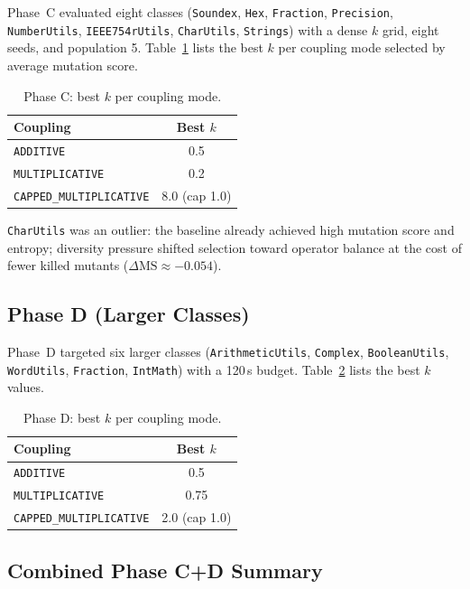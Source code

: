 \documentclass{IEEEtran}
\begin{document}
Phase~C evaluated eight classes (\texttt{Soundex}, \texttt{Hex}, \texttt{Fraction}, \texttt{Precision}, \texttt{NumberUtils}, \texttt{IEEE754rUtils}, \texttt{CharUtils}, \texttt{Strings}) with a dense $k$ grid, eight seeds, and population 5.
Table~\ref{tab:phc_k} lists the best $k$ per coupling mode selected by average mutation score.

\begin{table}[htbp]
\caption{Phase C: best $k$ per coupling mode.}
\label{tab:phc_k}
\centering
\small
\begin{tabular}{@{}lc@{}}
\toprule
Coupling & Best $k$ \\
\midrule
\texttt{ADDITIVE} & 0.5 \\
\texttt{MULTIPLICATIVE} & 0.2 \\
\texttt{CAPPED\_MULTIPLICATIVE} & 8.0 (cap 1.0) \\
\bottomrule
\end{tabular}
\end{table}

\texttt{CharUtils} was an outlier: the baseline already achieved high mutation score and entropy; diversity pressure shifted selection toward operator balance at the cost of fewer killed mutants ($\Delta\mathrm{MS} \approx -0.054$).

\subsection{Phase D (Larger Classes)}

Phase~D targeted six larger classes (\texttt{ArithmeticUtils}, \texttt{Complex}, \texttt{BooleanUtils}, \texttt{WordUtils}, \texttt{Fraction}, \texttt{IntMath}) with a 120\,s budget.
Table~\ref{tab:phd_k} lists the best $k$ values.

\begin{table}[htbp]
\caption{Phase D: best $k$ per coupling mode.}
\label{tab:phd_k}
\centering
\small
\begin{tabular}{@{}lc@{}}
\toprule
Coupling & Best $k$ \\
\midrule
\texttt{ADDITIVE} & 0.5 \\
\texttt{MULTIPLICATIVE} & 0.75 \\
\texttt{CAPPED\_MULTIPLICATIVE} & 2.0 (cap 1.0) \\
\bottomrule
\end{tabular}
\end{table}

\subsection{Combined Phase C+D Summary}
\end{document}
